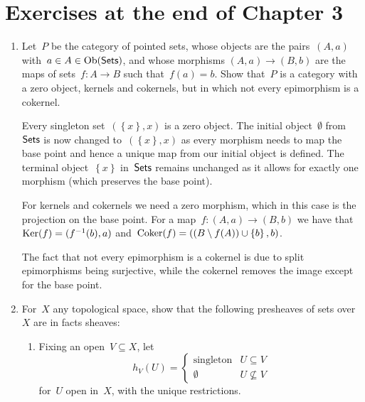 \documentclass[a4paper,11pt,oneside,openany,article]{memoir}
\begin{document}
\clearpage

\chapter{Exercises at the end of Chapter 3}
\begin{enumerate}
  \item Let~$P$ be the category of pointed sets, whose objects are the pairs~$(A,a)$ with~$a\in A\in\operatorname{Ob}(\mathsf{Sets})$, and whose morphisms $(A,a)\to(B,b)$ are the maps of sets~$f\colon A\to B$ such that~$f(a)=b$. Show that~$P$ is a category with a zero object, kernels and cokernels, but in which not every epimorphism is a cokernel.

    \begin{solution}
      Every singleton set~$(\left\{ x \right\},x)$ is a zero object. The initial object~$\emptyset$ from~$\mathsf{Sets}$ is now changed to~$(\left\{ x \right\},x)$ as every morphism needs to map the base point and hence a unique map from our initial object is defined. The terminal object~$\left\{ x \right\}$ in~$\mathsf{Sets}$ remains unchanged as it allows for exactly one morphism (which preserves the base point).

      For kernels and cokernels we need a zero morphism, which in this case is the projection on the base point. For a map~$f\colon(A,a)\to(B,b)$ we have that~$\operatorname{Ker}(f)=(f^{-1}(b),a)$ and~$\operatorname{Coker}(f)=((B\setminus f(A))\cup\left\{ b \right\},b)$.

      The fact that not every epimorphism is a cokernel is due to split epimorphisms being surjective, while the cokernel removes the image except for the base point.
    \end{solution}

  \item For~$X$ any topological space, show that the following presheaves of sets over~$X$ are in facts sheaves:
    \begin{enumerate}
      \item\label{enumerate:exercise-2-a} Fixing an open~$V\subseteq X$, let
        \begin{equation}
          h_V(U)=
          \begin{cases}
            \text{singleton} & U\subseteq V \\
            \emptyset & U\nsubseteq V
          \end{cases}
        \end{equation}
        for~$U$ open in~$X$, with the unique restrictions.


\end{enumerate}
\end{enumerate}
\end{document}
